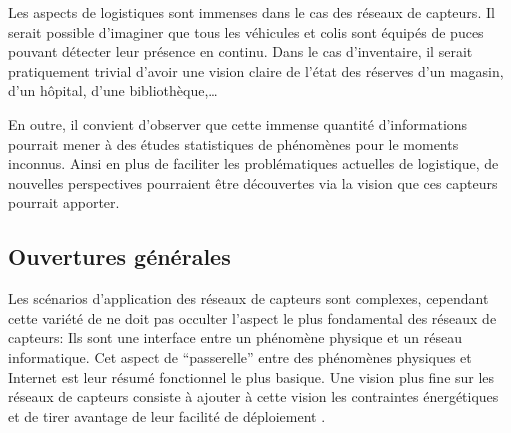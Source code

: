 Les aspects de logistiques sont immenses dans le cas des réseaux de capteurs.
Il serait possible d'imaginer que tous les véhicules et colis sont équipés de
puces pouvant détecter leur présence en continu.  Dans le cas d'inventaire, il
serait pratiquement trivial d'avoir une vision claire de l'état des réserves
d'un magasin, d'un hôpital, d'une bibliothèque,\ldots

En outre, il convient d'observer que cette immense quantité d'informations
pourrait mener à des études statistiques de phénomènes pour le moments
inconnus.  Ainsi en plus de faciliter les problématiques actuelles de
logistique, de nouvelles perspectives pourraient être découvertes via la vision
que ces capteurs pourrait apporter.

\subsection{Ouvertures générales}

Les scénarios d'application des réseaux de capteurs sont complexes, cependant
cette variété de ne doit pas occulter l'aspect le plus fondamental des réseaux
de capteurs: Ils sont une interface entre un phénomène physique et un réseau
informatique. Cet aspect de ``passerelle'' entre des phénomènes physiques et
Internet est leur résumé fonctionnel le plus basique.  Une vision plus fine sur
les réseaux de capteurs consiste à ajouter à cette vision les contraintes
énergétiques et de tirer avantage de leur facilité de déploiement
\cite{dunkels04ercim}.
